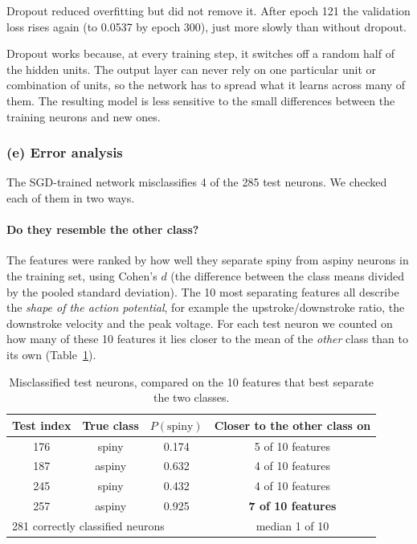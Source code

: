 \documentclass[11pt]{article}
\begin{document}
Dropout reduced overfitting but did not remove it. After epoch 121 the validation loss rises again (to 0.0537 by epoch 300), just more slowly than without dropout.

Dropout works because, at every training step, it switches off a random half of the hidden units. The output layer can never rely on one particular unit or combination of units, so the network has to spread what it learns across many of them. The resulting model is less sensitive to the small differences between the training neurons and new ones.

\FloatBarrier
\subsubsection*{(e) Error analysis}

The SGD-trained network misclassifies 4 of the 285 test neurons. We checked each of them in two ways.

\paragraph{Do they resemble the other class?}
The features were ranked by how well they separate spiny from aspiny neurons in the training set, using Cohen's $d$ (the difference between the class means divided by the pooled standard deviation). The 10 most separating features all describe the \emph{shape of the action potential}, for example the upstroke/downstroke ratio, the downstroke velocity and the peak voltage. For each test neuron we counted on how many of these 10 features it lies closer to the mean of the \emph{other} class than to its own (Table~\ref{tab:q4e}).

\begin{table}[H]
\centering
\caption{Misclassified test neurons, compared on the 10 features that best separate the two classes.}
\label{tab:q4e}
\small
\begin{tabular}{cccc}
\toprule
Test index & True class & $P(\text{spiny})$ & Closer to the other class on \\
\midrule
176 & spiny  & 0.174 & 5 of 10 features \\
187 & aspiny & 0.632 & 4 of 10 features \\
245 & spiny  & 0.432 & 4 of 10 features \\
257 & aspiny & 0.925 & \textbf{7 of 10 features} \\
\midrule
\multicolumn{3}{l}{281 correctly classified neurons} & median 1 of 10 \\
\bottomrule
\end{tabular}
\end{table}
\end{document}
